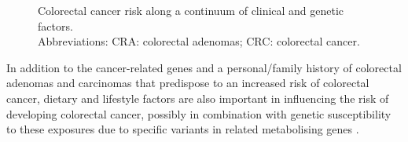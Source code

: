 \begin{figure} 
\caption{Colorectal cancer risk along a continuum of clinical and genetic factors. \\ Abbreviations: CRA: colorectal adenomas; CRC: colorectal cancer.} 
\label{figure1_1} 
\end{figure} 
 
\noindent In addition to the cancer-related genes and a personal/family history of colorectal adenomas and carcinomas that predispose to an increased risk of colorectal cancer, dietary and lifestyle factors are also important in influencing the risk of developing colorectal cancer, possibly in combination with genetic susceptibility to these exposures due to specific variants in related metabolising genes \cite{c126,c127}. 
 
